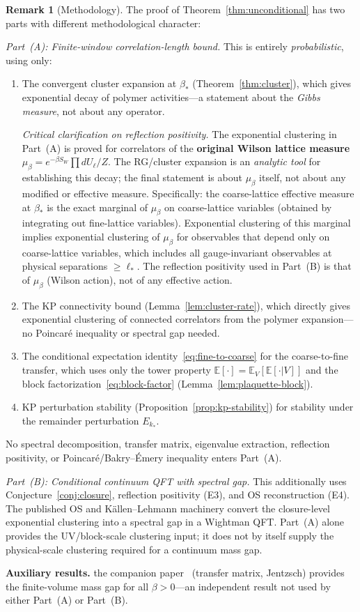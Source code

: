\documentclass[11pt]{article}
\theoremstyle{definition}
\newtheorem{remark}[theorem]{Remark}
\begin{document}
\begin{remark}[Methodology]\label{rem:method}
The proof of Theorem~\ref{thm:unconditional} has two parts with
different methodological character:

\emph{Part~(A): Finite-window correlation-length bound.}
This is entirely \emph{probabilistic}, using only:
\begin{enumerate}[nosep]
\item The convergent cluster expansion at $\beta_*$
(Theorem~\ref{thm:cluster}), which gives exponential decay
of polymer activities---a statement about the \emph{Gibbs
measure}, not about any operator.

\emph{Critical clarification on reflection positivity.}
The exponential clustering in Part~(A) is proved for
correlators of the \textbf{original Wilson lattice measure}
$\mu_\beta=e^{-\beta S_W}\prod dU_\ell/Z$.
The RG/cluster expansion is an \emph{analytic tool} for
establishing this decay; the final statement is about $\mu_\beta$
itself, not about any modified or effective measure.
Specifically: the coarse-lattice effective measure at $\beta_*$
is the exact marginal of $\mu_\beta$ on coarse-lattice variables
(obtained by integrating out fine-lattice variables).
Exponential clustering of this marginal implies exponential
clustering of $\mu_\beta$ for observables that depend only on
coarse-lattice variables, which includes all gauge-invariant
observables at physical separations $\ge\ell_*$.
The reflection positivity used in Part~(B) is that of
$\mu_\beta$ (Wilson action), not of any effective action.
\item The KP connectivity bound (Lemma~\ref{lem:cluster-rate}),
which directly gives exponential clustering of connected
correlators from the polymer expansion---no Poincar\'e
inequality or spectral gap needed.
\item The conditional expectation identity~\eqref{eq:fine-to-coarse}
for the coarse-to-fine transfer, which uses only the tower
property $\mathbb{E}[\cdot]=\mathbb{E}_V[\mathbb{E}[\cdot|V]]$
and the block factorization~\eqref{eq:block-factor}
(Lemma~\ref{lem:plaquette-block}).
\item KP perturbation stability
(Proposition~\ref{prop:kp-stability}) for
stability under the remainder perturbation $E_{k_*}$.
\end{enumerate}
No spectral decomposition, transfer matrix, eigenvalue extraction,
reflection positivity, or Poincar\'e/Bakry--\'Emery inequality
enters Part~(A).

\emph{Part~(B): Conditional continuum QFT with spectral gap.}
This additionally uses Conjecture~\ref{conj:closure}, reflection
positivity (E3), and OS reconstruction (E4).  The published OS and
K\"allen--Lehmann machinery convert the closure-level exponential
clustering into a spectral gap in a Wightman QFT.  Part~(A) alone
provides the UV/block-scale clustering input; it does not by itself
supply the physical-scale clustering required for a continuum mass gap.

\textbf{Auxiliary results.}
the companion paper~\cite{companion}
(transfer matrix, Jentzsch) provides the finite-volume
mass gap for all $\beta>0$---an independent result not
used by either Part~(A) or Part~(B).
\end{remark}
\end{document}
